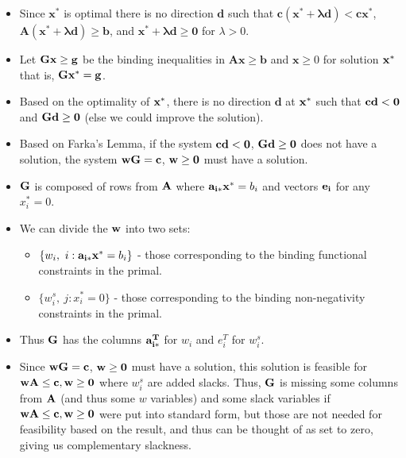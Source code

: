 \begin{itemize}
\item Since $\mathbf{x^*}$ is optimal there is no direction $\mathbf{d}$ such that $\mathbf{c(x^* + \lambda d)} < \mathbf{cx^*}$, $\mathbf{A(x^*+ \lambda d)} \ge \mathbf{b}$, and $\mathbf{x^*+ \lambda d} \ge \mathbf{0}$ for $\lambda > 0$.
\item Let ${\bf Gx } \ge {\bf g}$ be the binding inequalities in $\mathbf{Ax} \ge \mathbf{b}$ and $\mathbf{x} \ge 0$ for solution ${\bf x^*}$ that is, ${\bf Gx^*} = {\bf g}$. 
\item Based on the optimality of ${\bf x^*}$, there is no direction $\mathbf{d}$ at ${\bf x^*}$ such that ${\bf cd} < {\bf 0}$ and ${\bf Gd} \ge {\bf 0}$ (else we could improve the solution).
\item Based on Farka's Lemma, if the system ${\bf cd} < {\bf 0}$, ${\bf Gd} \ge {\bf 0}$ does not have a solution, the system ${\bf wG} = {\bf c}$, ${\bf w} \ge {\bf 0}$ must have a solution.
\item ${\bf G}$ is composed of rows from ${\bf A}$  where ${\bf a_{i*}x^*}=b_i$ and vectors ${\bf e_{i}}$ for any $x^*_i = 0$.
\item We can divide the ${\bf w}$ into two sets:
\begin{itemize}
\item  $\{w_i,~ i:{\bf a_{i*}x^*}=b_i\}$ - those corresponding to the binding functional constraints in the primal.
\item  $\{w^s_i,~ j:x^*_i=0\}$ - those corresponding to the binding non-negativity constraints in the primal.
\end{itemize}
\item Thus ${\bf G}$ has the columns ${\bf a_{i*}^T}$ for $w_i$ and $e_{i}^T$ for $w^s_i$.
\item Since  ${\bf wG} = {\bf c}$, ${\bf w} \ge {\bf 0}$ must have a solution, this solution is feasible for ${\bf wA} \le {\bf c}, {\bf w} \ge {\bf 0}$ where $w^s_i$ are added slacks. Thus,  ${\bf G}$ is missing some columns from ${\bf A}$ (and thus some $w$ variables) and some slack variables if ${\bf wA} \le {\bf c}, {\bf w} \ge {\bf 0}$ were put into standard form, but those are not needed for feasibility based on the result, and thus can be thought of as set to zero, giving us complementary slackness.
\end{itemize}







